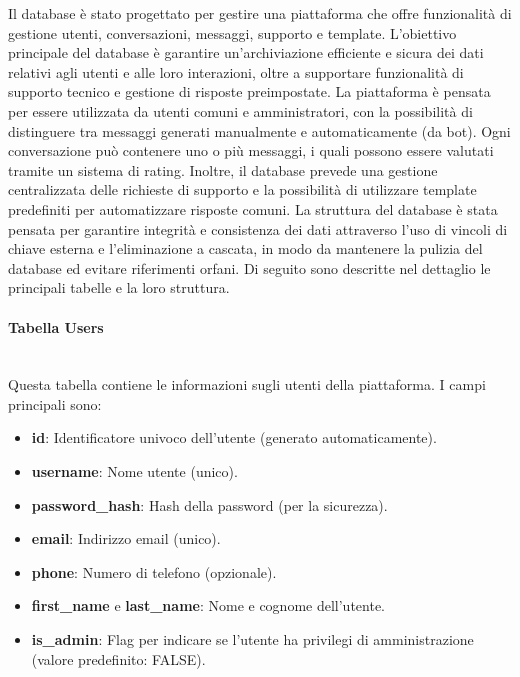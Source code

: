     Il database è stato progettato per gestire una piattaforma che offre funzionalità di gestione utenti, conversazioni, messaggi, supporto e template. 
    L'obiettivo principale del database è garantire un'archiviazione efficiente e sicura dei dati relativi agli utenti e alle loro interazioni, oltre a supportare funzionalità di supporto tecnico e gestione di risposte preimpostate.
    La piattaforma è pensata per essere utilizzata da utenti comuni e amministratori, con la possibilità di distinguere tra messaggi generati manualmente e automaticamente (da bot). 
    Ogni conversazione può contenere uno o più messaggi, i quali possono essere valutati tramite un sistema di rating. 
    Inoltre, il database prevede una gestione centralizzata delle richieste di supporto e la possibilità di utilizzare template predefiniti per automatizzare risposte comuni.
    La struttura del database è stata pensata per garantire integrità e consistenza dei dati attraverso l'uso di vincoli di chiave esterna e l'eliminazione a cascata, in modo da mantenere la pulizia del database ed evitare riferimenti orfani. 
    Di seguito sono descritte nel dettaglio le principali tabelle e la loro struttura.


    \paragraph{Tabella Users} \mbox{} \\
    Questa tabella contiene le informazioni sugli utenti della piattaforma. I campi principali sono:
    \begin{itemize}
        \item \textbf{id}: Identificatore univoco dell'utente (generato automaticamente).
        \item \textbf{username}: Nome utente (unico).
        \item \textbf{password\_hash}: Hash della password (per la sicurezza).
        \item \textbf{email}: Indirizzo email (unico).
        \item \textbf{phone}: Numero di telefono (opzionale).
        \item \textbf{first\_name} e \textbf{last\_name}: Nome e cognome dell'utente.
        \item \textbf{is\_admin}: Flag per indicare se l'utente ha privilegi di amministrazione (valore predefinito: FALSE).
    \end{itemize}
    
